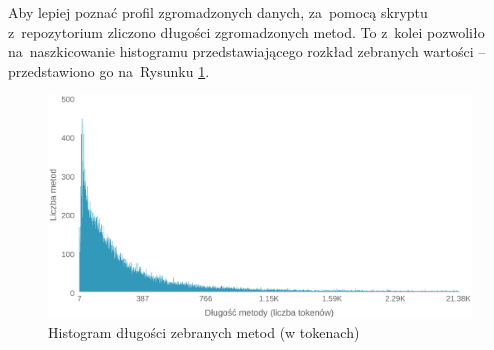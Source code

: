 \documentclass[twoside]{praca}
\begin{document}




Aby lepiej poznać profil zgromadzonych danych, za~pomocą skryptu  z~repozytorium \cite{fracz:refactor-extractor} zliczono długości zgromadzonych metod. To z~kolei pozwoliło na~naszkicowanie histogramu przedstawiającego rozkład zebranych wartości -- przedstawiono go na~Rysunku \ref{fig:learn:histogram-dlugosci}.

\begin{figure}[h]
\centering
\includegraphics[width=\textwidth]{learn/input-histogram.eps}
\caption{Histogram długości zebranych metod (w tokenach)}
\label{fig:learn:histogram-dlugosci}
\end{figure}
\end{document}
